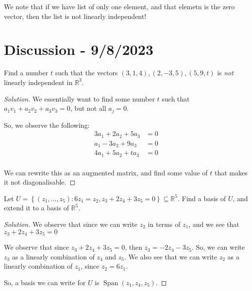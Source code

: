 \documentclass[openany]{book}
\newenvironment{solution}{\begin{proof}[Solution]}{\end{proof}}
\newcommand{\RR}{\mathbb{R}}
\DeclareMathOperator*{\Span}{Span}
\begin{document}
\begin{rmk}
	We note that if we have list of only one element, and that elemetn is the zero vector, then the list is not linearly independent!
\end{rmk}

\section{Discussion - 9/8/2023}
\begin{hw}
	Find a number $t$ such that the vectors $(3,1,4), (2,-3,5), (5,9,t)$ is \textit{not} linearly independent in $\RR^{3}$.
\end{hw}
\begin{solution}
	We essentially want to find some number $t$ such that $a_{1}v_{1} + a_{2}v_{2} + a_{3}v_{3} = 0$, but not all $a_{j} = 0$.
	
	So, we observe the following:
	\begin{align*}
		3a_{1} + 2a_{2} + 5a_{3} &= 0 \\
		a_{1} - 3a_{2} + 9a_{3} &= 0 \\
		4a_{1} + 5a_{2} + ta_{3} &= 0 \\
	\end{align*}

	We can rewrite this as an augmented matrix, and find some value of $t$ that makes it not diagonalisable.
\end{solution}

\begin{hw}
	Let $U = \left\{  (z_{1}, \ldots, z_{5}) : 6z_{1} = z_{2}, z_{3} + 2z_{4} + 3z_{5} = 0 \right\} \subseteq \RR^{5}$. Find a basis of $U$, and extend it to a basis of $\RR^{5}$.
\end{hw}
\begin{solution}
	We observe that since we can write $ z_{2} $ in terms of $z_{1}$, and we see that $z_{3} + 2z_{4} + 3z_{5} = 0$
	
	We observe that since $z_{3} + 2z_{4} + 3z_{5} = 0$, then $z_{3} = -2z_{4} - 3z_{5}$. So, we can write $z_{3}$ as a linearly combination of $z_{4}$ and $z_{5}$. We also see that we can write $z_{2}$ as a linearly combination of $z_{1}$, since $z_{2} = 6z_{1}$.
	
	So, a basis we can write for $U$ is $\Span(z_{1}, z_{4}, z_{5})$.
\end{solution}
\end{document}
